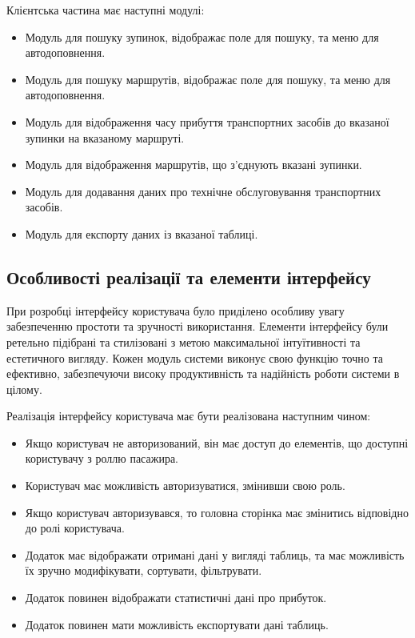 \documentclass[oneside,14pt]{extarticle}
\begin{document}
Клієнтська частина має наступні модулі:
\begin{itemize}
\item Модуль для пошуку зупинок, відображає поле для пошуку, та меню для автодоповнення.
\item Модуль для пошуку маршрутів, відображає поле для пошуку, та меню для автодоповнення.
\item Модуль для відображення часу прибуття транспортних засобів до вказаної зупинки на вказаному маршруті.
\item Модуль для відображення маршрутів, що з'єднують вказані зупинки.
\item Модуль для додавання даних про технічне обслуговування транспортних засобів.
\item Модуль для експорту даних із вказаної таблиці.
\end{itemize}

\subsection{Особливості реалізації та елементи інтерфейсу}
При розробці інтерфейсу користувача було приділено особливу увагу забезпеченню простоти та зручності використання. Елементи інтерфейсу були ретельно підібрані та стилізовані з метою максимальної інтуїтивності та естетичного вигляду. Кожен модуль системи виконує свою функцію точно та ефективно, забезпечуючи високу продуктивність та надійність роботи системи в цілому.

Реалізація інтерфейсу користувача має бути реалізована наступним чином:
\begin{itemize}
	\item Якщо користувач не авторизований, він має доступ до елементів, що доступні користувачу з роллю пасажира.
	\item Користувач має можливість авторизуватися, змінивши свою роль.
	\item Якщо користувач авторизувався, то головна сторінка має змінитись відповідно до ролі користувача.
	\item Додаток має відображати отримані дані у вигляді таблиць, та має можливість їх зручно модифікувати, сортувати, фільтрувати.
	\item Додаток повинен відображати статистичні дані про прибуток.
	\item Додаток повинен мати можливість експортувати дані таблиць.
\end{itemize}

\newpage
\end{document}
